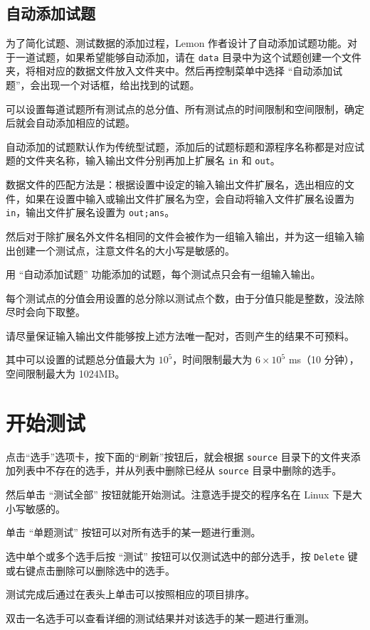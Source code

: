 \documentclass[12pt, a4paper]{article}
\begin{document}
\subsection{自动添加试题}
为了简化试题、测试数据的添加过程，Lemon 作者设计了自动添加试题功能。对于一道试题，如果希望能够自动添加，请在 \texttt{data} 目录中为这个试题创建一个文件夹，将相对应的数据文件放入文件夹中。然后再控制菜单中选择 “自动添加试题”，会出现一个对话框，给出找到的试题。

可以设置每道试题所有测试点的总分值、所有测试点的时间限制和空间限制，确定后就会自动添加相应的试题。

自动添加的试题默认作为传统型试题，添加后的试题标题和源程序名称都是对应试题的文件夹名称，输入输出文件分别再加上扩展名 \texttt{in} 和 \texttt{out}。

数据文件的匹配方法是：根据设置中设定的输入输出文件扩展名，选出相应的文件，如果在设置中输入或输出文件扩展名为空，会自动将输入文件扩展名设置为 \texttt{in}，输出文件扩展名设置为 \texttt{out;ans}。

然后对于除扩展名外文件名相同的文件会被作为一组输入输出，并为这一组输入输出创建一个测试点，注意文件名的大小写是敏感的。

用 “自动添加试题” 功能添加的试题，每个测试点只会有一组输入输出。

每个测试点的分值会用设置的总分除以测试点个数，由于分值只能是整数，没法除尽时会向下取整。

请尽量保证输入输出文件能够按上述方法唯一配对，否则产生的结果不可预料。

其中可以设置的试题总分值最大为 $10^5$，时间限制最大为 $6 \times 10^5$ ms（10 分钟），空间限制最大为 1024MB。

\section{开始测试}
点击“选手”选项卡，按下面的“刷新”按钮后，就会根据 \texttt{source} 目录下的文件夹添加列表中不存在的选手，并从列表中删除已经从 \texttt{source} 目录中删除的选手。

然后单击 “测试全部” 按钮就能开始测试。注意选手提交的程序名在 Linux 下是大小写敏感的。

单击 “单题测试” 按钮可以对所有选手的某一题进行重测。

选中单个或多个选手后按 “测试” 按钮可以仅测试选中的部分选手，按 \texttt{Delete} 键或右键点击删除可以删除选中的选手。

测试完成后通过在表头上单击可以按照相应的项目排序。

双击一名选手可以查看详细的测试结果并对该选手的某一题进行重测。
\end{document}
